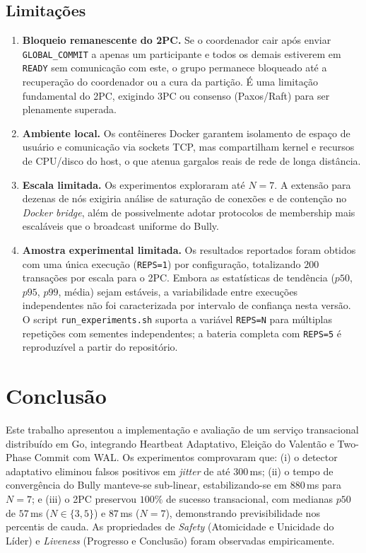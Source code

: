 \documentclass[conference]{IEEEtran}
\begin{document}
\subsection{Limitações}
\begin{enumerate}
  \item \textbf{Bloqueio remanescente do 2PC.} Se o coordenador cair após enviar \texttt{GLOBAL\_COMMIT} a apenas um participante e todos os demais estiverem em \texttt{READY} sem comunicação com este, o grupo permanece bloqueado até a recuperação do coordenador ou a cura da partição. É uma limitação fundamental do 2PC, exigindo 3PC ou consenso (Paxos/Raft) para ser plenamente superada.
  \item \textbf{Ambiente local.} Os contêineres Docker garantem isolamento de espaço de usuário e comunicação via sockets TCP, mas compartilham kernel e recursos de CPU/disco do host, o que atenua gargalos reais de rede de longa distância.
  \item \textbf{Escala limitada.} Os experimentos exploraram até $N=7$. A extensão para dezenas de nós exigiria análise de saturação de conexões e de contenção no \textit{Docker bridge}, além de possivelmente adotar protocolos de membership mais escaláveis que o broadcast uniforme do Bully.
  \item \textbf{Amostra experimental limitada.} Os resultados reportados foram obtidos com uma única execução (\texttt{REPS=1}) por configuração, totalizando $200$ transações por escala para o 2PC. Embora as estatísticas de tendência ($p50$, $p95$, $p99$, média) sejam estáveis, a variabilidade entre execuções independentes não foi caracterizada por intervalo de confiança nesta versão. O script \texttt{run\_experiments.sh} suporta a variável \texttt{REPS=N} para múltiplas repetições com sementes independentes; a bateria completa com \texttt{REPS=5} é reproduzível a partir do repositório.
\end{enumerate}

\section{Conclusão}
Este trabalho apresentou a implementação e avaliação de um serviço transacional distribuído em Go, integrando Heartbeat Adaptativo, Eleição do Valentão e Two-Phase Commit com WAL. Os experimentos comprovaram que: (i) o detector adaptativo eliminou falsos positivos em \textit{jitter} de até $300$\,ms; (ii) o tempo de convergência do Bully manteve-se sub-linear, estabilizando-se em $880$\,ms para $N=7$; e (iii) o 2PC preservou $100\%$ de sucesso transacional, com medianas $p50$ de $57$\,ms ($N\in\{3,5\}$) e $87$\,ms ($N=7$), demonstrando previsibilidade nos percentis de cauda. As propriedades de \textit{Safety} (Atomicidade e Unicidade do Líder) e \textit{Liveness} (Progresso e Conclusão) foram observadas empiricamente.
\end{document}
